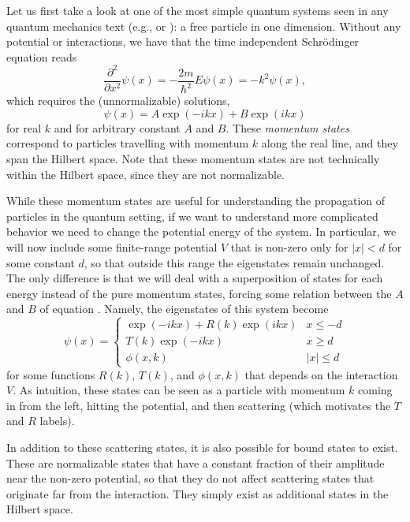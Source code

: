 \documentclass[../thesis-main/thesis-main]{subfiles}
\begin{document}
Let us first take a look at one of the most simple quantum systems seen in any quantum mechanics text (e.g., \cite{GriQM} or \cite{SakMQM}): a free particle in one dimension.  Without any potential or interactions, we have that the time independent Schr\"{o}dinger equation reads
\begin{equation}
  \frac{\partial^2}{\partial x^2} \psi(x) = -\frac{2m}{\hbar^2}E \psi(x) = -k^2 \psi(x),
\end{equation}
which requires the (unnormalizable) solutions,
\begin{equation}
  \psi(x) = A \exp(- i k x) + B \exp(i k x) \label{eq:simple_motivating_momentum_states}
\end{equation}
for real $k$ and for arbitrary constant $A$ and $B$.  These \textit{momentum states} correspond to particles travelling with momentum $k$ along the real line, and they span the Hilbert space.  Note that these momentum states are not technically within the Hilbert space, since they are not normalizable. 

While these momentum states are useful for understanding the propagation of particles in the quantum setting, if we want to understand more complicated behavior we need to change the potential energy of the system.  In particular, we will now include some finite-range potential $V$ that is non-zero only for $|x| < d$ for some constant $d$, so that outside this range the eigenstates remain unchanged.  The only difference is that we will deal with a superposition of states for each energy instead of the pure momentum states, forcing some relation between the $A$ and $B$ of equation .  Namely, the eigenstates of this system become
\begin{equation}
  \psi(x) = \begin{cases}
    \exp(-i k x) + R(k) \exp(i k x) & x \leq -d\\
    T(k) \exp(- i k x) & x \geq d\\
    \phi(x,k) & |x| \leq d
    \end{cases}
\end{equation}
for some functions $R(k)$, $T(k)$, and $\phi(x,k)$ that depends on the interaction $V$.  As intuition, these states can be seen as a particle with momentum $k$ coming in from the left, hitting the potential, and then scattering (which motivates the $T$ and $R$ labels).  

In addition to these scattering states, it is also possible for bound states to exist.  These are normalizable states that have a constant fraction  of their amplitude near the non-zero potential, so that they do not affect scattering states that originate far from the interaction.  They simply exist as additional states in the Hilbert space.
\end{document}
